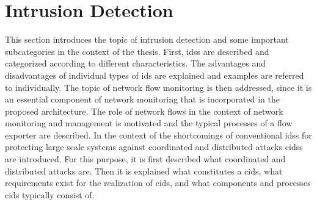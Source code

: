\documentclass[../../../main.tex]{subfiles}
\begin{document}
\section{Intrusion Detection}\label{sec:intrusion_detection}

This section introduces the topic of intrusion detection and some important subcategories in the context of the thesis. First, \glspl{ids} are described and categorized according to different characteristics. The advantages and disadvantages of individual types of \acrshort{ids} are explained and examples are referred to individually. The topic of network flow monitoring is then addressed, since it is an essential component of network monitoring that is incorporated in the proposed architecture. The role of network flows in the context of network monitoring and management is motivated and the typical processes of a flow exporter are described. In the context of the shortcomings of conventional \glspl{ids} for protecting large scale systems against coordinated and distributed attacks \glspl{cids} are introduced. For this purpose, it is first described what coordinated and distributed attacks are. Then it is explained what constitutes a \gls{cids}, what requirements exist for the realization of \gls{cids}, and what components and processes \acrshort{cids} typically consist of.






\end{document}
